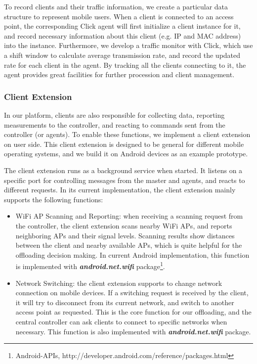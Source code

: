 \documentclass[english]{tktltiki}
\begin{document}
To record clients and their traffic information, we create a particular data structure to represent mobile users. When a client is connected to an access point, the corresponding Click agent will first initialize a client instance for it, and record necessary information about this client (e.g. IP and MAC address) into the instance. Furthermore, we develop a traffic monitor with Click, which use a shift window to calculate average transmission rate, and record the updated rate for each client in the agent. By tracking all the clients connecting to it, the agent provides great facilities for further procession and client management. 

\subsubsection{Client Extension}

In our platform, clients are also responsible for collecting data, reporting measurements to the controller, and reacting to commands sent from the controller (or agents). To enable these functions, we implement a client extension on user side. This client extension is designed to be general for different mobile operating systems, and we build it on Android devices as an example prototype.

The client extension runs as a background service when started. It listens on a specific port for controlling messages from the master and agents, and reacts to different requests. In its current implementation, the client extension mainly supports the following functions:

\begin{itemize}
  \item WiFi AP Scanning and Reporting: when receiving a scanning request from the controller, the client extension scans nearby WiFi APs, and reports neighboring APs and their signal levels. Scanning results show distances between the client and nearby available APs, which is quite helpful for the offloading decision making. In current Android implementation, this function is implemented with \textbf{\textit{android.net.wifi}} package\footnote[12]{Android-APIs, http://developer.android.com/reference/packages.html}.
  \item Network Switching: the client extension supports to change network connection on mobile devices. If a switching request is received by the client, it will try to disconnect from its current network, and switch to another access point as requested. This is the core function for our offloading, and the central controller can ask clients to connect to specific networks when necessary. This function is also implemented with \textbf{\textit{android.net.wifi}} package.
\end{itemize}
  
\end{document}
